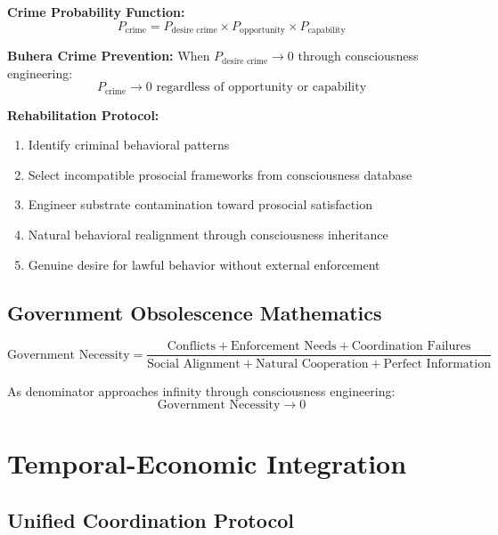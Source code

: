 \documentclass[12pt,a4paper]{article}
\begin{document}
\textbf{Crime Probability Function:}
\begin{equation}
P_{\text{crime}} = P_{\text{desire crime}} \times P_{\text{opportunity}} \times P_{\text{capability}}
\end{equation}

\textbf{Buhera Crime Prevention:}
When $P_{\text{desire crime}} \to 0$ through consciousness engineering:
\begin{equation}
P_{\text{crime}} \to 0 \text{ regardless of opportunity or capability}
\end{equation}

\textbf{Rehabilitation Protocol:}
\begin{enumerate}
\item Identify criminal behavioral patterns
\item Select incompatible prosocial frameworks from consciousness database
\item Engineer substrate contamination toward prosocial satisfaction
\item Natural behavioral realignment through consciousness inheritance
\item Genuine desire for lawful behavior without external enforcement
\end{enumerate}

\subsection{Government Obsolescence Mathematics}

\begin{equation}
\text{Government Necessity} = \frac{\text{Conflicts} + \text{Enforcement Needs} + \text{Coordination Failures}}{\text{Social Alignment} + \text{Natural Cooperation} + \text{Perfect Information}}
\end{equation}

As denominator approaches infinity through consciousness engineering:
\begin{equation}
\text{Government Necessity} \to 0
\end{equation}

\section{Temporal-Economic Integration}

\subsection{Unified Coordination Protocol}
\end{document}
